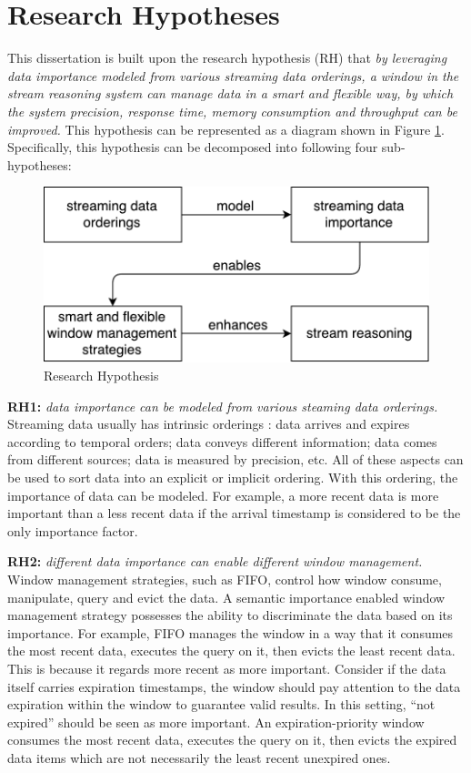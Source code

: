 \section{Research Hypotheses}
This dissertation is built upon the research hypothesis (RH) that \textit{by leveraging data importance modeled from various streaming data orderings, a window in the stream reasoning system can manage data in a smart and flexible way, by which the system precision, response time, memory consumption and throughput can be improved.}
This hypothesis can be represented as a diagram shown in Figure \ref{fig:1-rh}.
Specifically, this hypothesis can be decomposed into following four sub-hypotheses:

\begin{figure}[!htbp]
	\centering
	\includegraphics[width=5in]{img/1-rh.pdf}
	\caption{Research Hypothesis}
	\label{fig:1-rh} 
\end{figure}

\textbf{RH1:} \textit{data importance can be modeled from various steaming data orderings.}
Streaming data usually has intrinsic orderings \cite{della2013order}: 
data arrives and expires according to temporal orders; 
data conveys different information;
data comes from different sources;
data is measured by precision, etc.
All of these aspects can be used to sort data into an explicit or implicit ordering. 
With this ordering, the importance of data can be modeled.
For example, a more recent data is more important than a less recent data if the arrival timestamp is considered to be the only importance factor.

\textbf{RH2:} \textit{different data importance can enable different window management.}
Window management strategies, such as FIFO, control how window consume, manipulate, query and evict the data. 
A semantic importance enabled window management strategy possesses the ability to discriminate the data based on its importance. 
For example, FIFO manages the window in a way that it consumes the most recent data, executes the query on it, then evicts the least recent data. 
This is because it regards more recent as more important. 
Consider if the data itself carries expiration timestamps, the window should pay attention to the data expiration within the window to guarantee valid results.
In this setting, ``not expired'' should be seen as more important. 
An expiration-priority window consumes the most recent data, executes the query on it, then evicts the expired data items which are not necessarily the least recent unexpired ones. 

